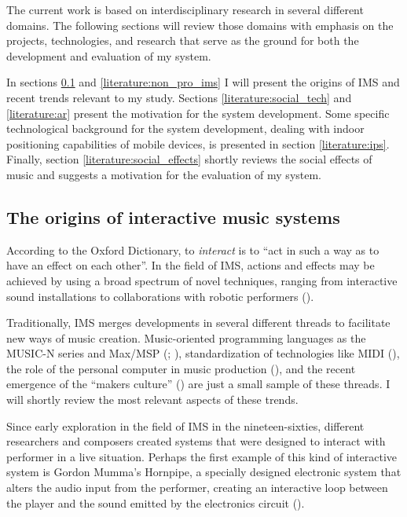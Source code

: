 \documentclass[a4paper,11pt]{article}
\begin{document}
The current work is based on interdisciplinary research in several different domains.
The following sections will review those domains with emphasis on the projects, technologies, and research that serve as the ground for both the development and evaluation of my system.

In sections \ref{literature:ims} and \ref{literature:non_pro_ims} I will present the origins of IMS and recent trends relevant to my study.
Sections \ref{literature:social_tech} and \ref{literature:ar} present the motivation for the system development.
Some specific technological background for the system development, dealing with indoor positioning capabilities of mobile devices, is presented in section \ref{literature:ips}.
Finally, section \ref{literature:social_effects} shortly reviews the social effects of music and suggests a motivation for the evaluation of my system.

\subsection{The origins of interactive music systems} \label{literature:ims}

According to the Oxford Dictionary, to \emph{interact} is to ``act in such a way as to have an effect on each other''.
In the field of IMS, actions and effects may be achieved by using a broad spectrum of novel techniques, ranging from interactive sound installations to collaborations with robotic performers (\cite{drummond09}).

Traditionally, IMS merges developments in several different threads to facilitate new ways of music creation.
Music-oriented programming languages as the MUSIC-N series and Max/MSP (\cite{mathews69}; \cite[p. 16]{winkler01}), standardization of technologies like MIDI (\cite{web:quinn}), the role of the personal computer in music production (\cite{leider:04}), and the recent emergence of the ``makers culture'' (\cite{kuznetsov2010rise}) are just a small sample of these threads.
I will shortly review the most relevant aspects of these trends.

Since early exploration in the field of IMS in the nineteen-sixties, different researchers and composers created systems that were designed to interact with performer in a live situation.
Perhaps the first example of this kind of interactive system is Gordon Mumma's Hornpipe, a specially designed electronic system that alters the audio input from the performer, creating an interactive loop between the player and the sound emitted by the electronics circuit (\cite[p. 12]{winkler01}).
\end{document}
